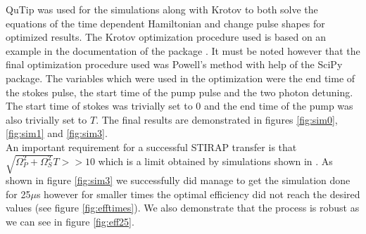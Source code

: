 \documentclass[%
 reprint,
 amsmath,amssymb,
 aps,
]{revtex4-2}
\begin{document}

QuTip \cite{Johansson_2012,Johansson_2013} was used for the simulations along with Krotov \cite{GoerzSPP2019} to both solve the equations of the time dependent Hamiltonian and change pulse shapes for optimized results. The Krotov optimization procedure used is based on an example in the documentation of the package \cite{krotov.example}. It must be noted however that the final optimization procedure used was Powell's method \cite{10.1093/comjnl/7.2.155} with help of the SciPy package. The variables which were used in the optimization were the end time of the stokes pulse, the start time of the pump pulse and the two photon detuning. The start time of stokes was trivially set to 0 and the end time of the pump was also trivially set to $T$. The final results are demonstrated in figures \ref{fig:sim0}, \ref{fig:sim1} and \ref{fig:sim3}.\\
An important requirement for a successful STIRAP transfer is that $\sqrt{\Omega_P^2+\Omega_S^2}T >> 10$ which is a limit obtained by simulations shown in \cite{RevModPhys.70.1003}. As shown in figure \ref{fig:sim3} we successfully did manage to get the simulation done for 25$\mu$s however for smaller times the optimal efficiency did not reach the desired values (see figure \ref{fig:efftimes}). We also demonstrate that the process is robust as we can see in figure \ref{fig:eff25}.
\end{document}
